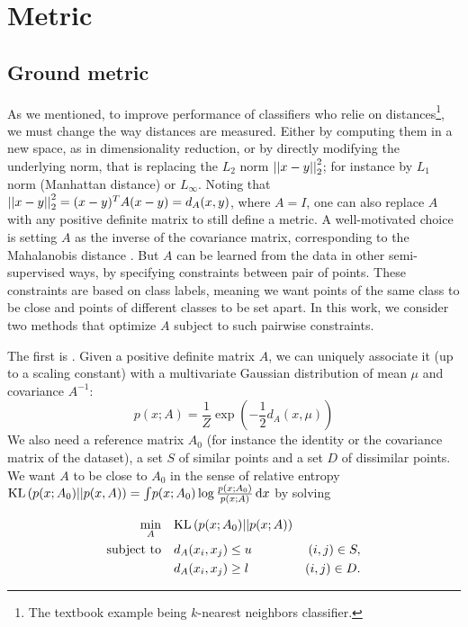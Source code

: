 \section{Metric}
\label{sec:metric}

\subsection{Ground metric}
\label{sub:metric-learning}

As we mentioned, to improve performance of classifiers who relie on
distances\footnote{The textbook example being $k$-nearest neighbors
classifier.}, we must change the way distances are measured. Either by
computing  them in a new space, as in dimensionality reduction, or by
directly modifying the underlying norm, that is replacing the
$L_2$ norm $\left|\left|x-y\right|\right|_2^2$; for instance by $L_1$ norm (Manhattan distance)
or $L_\infty$. Noting that $\left|\left|x-y\right|\right|_2^2 = (x-y)^T A (x-y) = d_A(x,y)$,
where $A=I$, one can also replace $A$ with any positive definite matrix to still
define a metric. A well-motivated choice is setting $A$ as the inverse of the
covariance matrix, corresponding to the Mahalanobis distance
\autocite{Mahalanobis36}. But $A$ can be learned from the data in other
semi-supervised ways, by specifying constraints between pair of points. These
constraints are based on class labels, meaning we want points of the same class
to be close and points of different classes to be set apart. In this work, we
consider two methods that optimize $A$ subject to such pairwise constraints.

The first is 
\autocite{InfoMetric07}. Given a positive definite matrix $A$, we can uniquely
associate it (up to a scaling constant) with a multivariate Gaussian
distribution of mean $\mu$ and covariance $A^{-1}$: \[p(x; A) =
\frac{1}{Z}\exp\left(-\frac{1}{2}d_A(x, \mu)\right)\] We also need a reference
matrix $A_0$ (for instance the identity or the covariance matrix of the
dataset), a set $S$ of similar points and a set $D$ of dissimilar points. We
want $A$ to be close to $A_0$ in the sense of relative entropy $\mathrm{KL}\left(p(x;
A_0)||p(x,A)\right) = \int \! p(x; A_0) \log\frac{p(x; A_0)}{p(x; A)}\, \mathrm{d}x$
by solving

\begin{align*}
	\min_A &\quad \mathrm{KL}\left(p(x; A_0)||p(x; A)\right) &\quad\\
	\text{subject to} &\quad d_A(x_i, x_j) \leq u &(i,j) \in S,\\
 &\quad d_A(x_i, x_j) \geq l &(i,j) \in D.
\end{align*}

